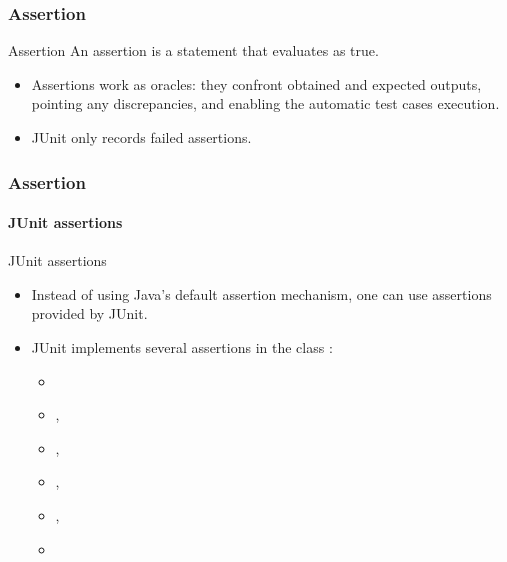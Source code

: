 \begin{frame}[parent={concept:junit}, hasprev=false, hasnext=true]
\frametitle{Assertion}
\label{concept:assertion}
\label{concept:junit-assertion}

\begin{block:concept}{Assertion}
An assertion is a statement that evaluates as true.
\end{block:concept}

\begin{block:fact}{}
\begin{itemize}
	\item Assertions work as oracles: they confront obtained and expected
	outputs, pointing any discrepancies, and enabling the automatic test
	cases execution.

	\item JUnit only records failed assertions.
\end{itemize}
\end{block:fact}

\hfill
{}
\end{frame}


\begin{frame}[hasprev=true, hasnext=false]
\frametitle{Assertion}
\framesubtitle{JUnit assertions}

\begin{block:fact}{JUnit assertions}
\begin{itemize}
	\item Instead of using Java's default assertion mechanism, one can use
	assertions provided by JUnit.

	\item JUnit implements several assertions in the class :
	\begin{itemize}
		\item {}
		\item {}, 
		\item {}, 
		\item {}, 
		\item {}, 
		\item {}
	\end{itemize}
\end{itemize}
\end{block:fact}
\end{frame}